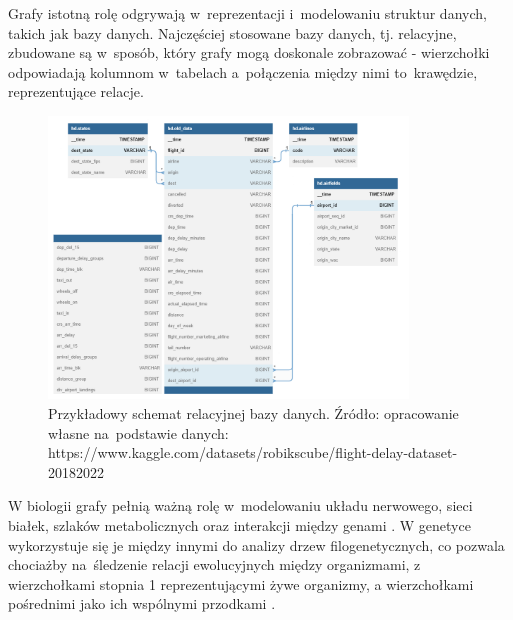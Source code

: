 Grafy istotną rolę odgrywają w~reprezentacji i~modelowaniu struktur danych, takich jak bazy danych.
Najczęściej stosowane bazy danych, tj. relacyjne, zbudowane są w~sposób, który grafy mogą doskonale zobrazować -
wierzchołki odpowiadają kolumnom w~tabelach a~połączenia między nimi to~krawędzie, reprezentujące relacje.

\begin{figure}[ht]
	\centering
	\includegraphics[height=7.5cm]{resources/introduction/images/database.png}
	\caption{Przykładowy schemat relacyjnej bazy danych.
		Źródło: opracowanie własne na~podstawie danych:
		https://www.kaggle.com/datasets/robikscube/flight-delay-dataset-20182022}
    \label{Fig:intro-2}
\end{figure}
\FloatBarrier

\clearpage

W biologii grafy pełnią ważną rolę w~modelowaniu układu nerwowego, sieci białek,
szlaków metabolicznych oraz interakcji między genami \cite{Chung2021}.
W genetyce wykorzystuje się je między innymi do analizy drzew filogenetycznych,
co pozwala chociażby na~śledzenie relacji ewolucyjnych między organizmami,
z wierzchołkami stopnia 1 reprezentującymi żywe organizmy,
a wierzchołkami pośrednimi jako ich wspólnymi przodkami \cite{Erciyes2023}.

